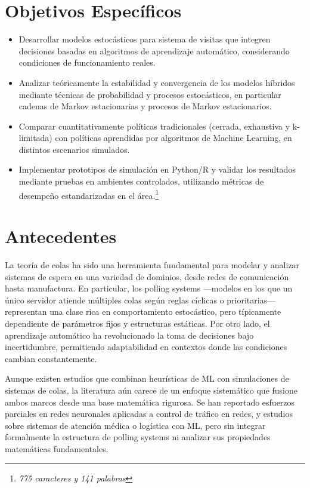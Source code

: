 \documentclass[12pt]{article}
\begin{document}
\section{Objetivos Específicos}
\begin{itemize}
  \item Desarrollar modelos estocásticos para sistema de visitas que integren decisiones basadas en algoritmos de aprendizaje automático, considerando condiciones de funcionamiento reales.
  
  \item Analizar teóricamente la estabilidad y convergencia de los modelos híbridos mediante técnicas de probabilidad y procesos estocásticos, en particular cadenas de Markov estacionarias y procesos de Markov estacionarios.
  
  \item Comparar cuantitativamente políticas tradicionales (cerrada, exhaustiva y k-limitada) con políticas aprendidas por algoritmos de Machine Learning, en distintos escenarios simulados.
  
  \item Implementar prototipos de simulación en Python/R y validar los resultados mediante pruebas en ambientes controlados, utilizando métricas de desempeño estandarizadas en el área.\footnote{\textit{775 caracteres y 141 palabras}}
\end{itemize}

\section{Antecedentes}
La teoría de colas ha sido una herramienta fundamental para modelar y analizar sistemas de espera en una variedad de dominios, desde redes de comunicación hasta manufactura. En particular, los polling systems —modelos en los que un único servidor atiende múltiples colas según reglas cíclicas o prioritarias— representan una clase rica en comportamiento estocástico, pero típicamente dependiente de parámetros fijos y estructuras estáticas. Por otro lado, el aprendizaje automático ha revolucionado la toma de decisiones bajo incertidumbre, permitiendo adaptabilidad en contextos donde las condiciones cambian constantemente.

Aunque existen estudios que combinan heurísticas de ML con simulaciones de sistemas de colas, la literatura aún carece de un enfoque sistemático que fusione ambos marcos desde una base matemática rigurosa. Se han reportado esfuerzos parciales en redes neuronales aplicadas a control de tráfico en redes, y estudios sobre sistemas de atención médica o logística con ML, pero sin integrar formalmente la estructura de polling systems ni analizar sus propiedades matemáticas fundamentales. 
\end{document}
